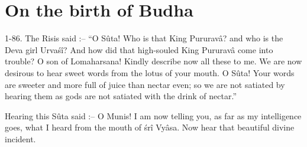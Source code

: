 \chapter{On the birth of Budha}

1-86. The Risis said :-- ``O S\^uta! Who is that King Pururav\^a? and who is the Deva girl Urva\'s\^i? And how did that high-souled King Pururav\^a come into trouble? O son of Lomaharsana! Kindly describe now all these to me. We are now desirous to hear sweet words from the lotus of your mouth. O S\^uta! Your words are sweeter and more full of juice than nectar even; so we are not satiated by hearing them as gods are not satiated with the drink of nectar.''

Hearing this S\^uta said :-- O Munis! I am now telling you, as far as my intelligence goes, what I heard from the mouth of \'sr\^i Vy\^asa. Now hear that beautiful divine incident.

